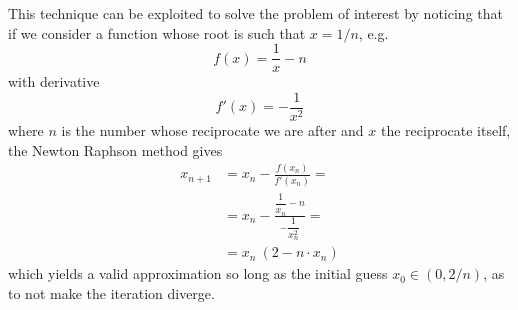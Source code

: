 This technique can be exploited to solve the problem of interest by noticing that if we consider a function whose root is such that $x = 1/n$, e.g.
\begin{equation}
f(x) = \frac{1}{x} - n
\end{equation}
with derivative
$$
f'(x) = -\frac{1}{x^2}
$$
where $n$ is the number whose reciprocate we are after and $x$ the reciprocate itself, the Newton Raphson method gives
\begin{equation}
\begin{aligned}
x_{n+1} &= x_n - \frac{f(x_n)}{f'(x_n)} = \\
& = x_n - \frac{\dfrac{1}{x_n} - n}{-\dfrac{1}{x_n^2}} = \\
& = x_n\ (2 - n \cdot x_n)
\end{aligned}
\end{equation}
which yields a valid approximation so long as the initial guess $x_0 \in (0, 2/n)$, as to not make the iteration diverge.


